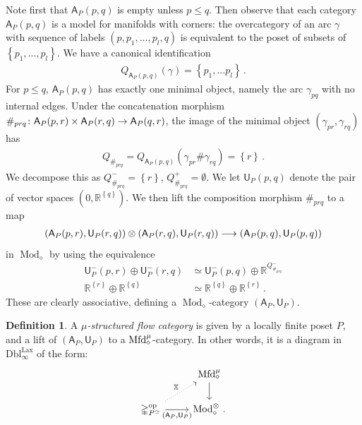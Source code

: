 \documentclass[10pt]{amsart}
\numberwithin{equation}{section}
\theoremstyle{definition}
\newtheorem{definition}[prop]{Definition}
\DeclareMathOperator{\Mod}{Mod}
\DeclareMathOperator{\op}{op}
\DeclareMathOperator{\Lax}{Lax}
\newcommand{\Mfd}{\mathrm{Mfd}\vphantom{d}}
\newcommand{\bR}{\mathbb{R}}
\newcommand{\bX}{\mathbb{X}}
\newcommand{\Simp}{\mathbb{\Delta}}
\newcommand{\sfA}{\mathsf{A}}
\newcommand{\sfU}{\mathsf{U}}
\newcommand{\DblLax}{ \mathrm{Dbl}_{\infty}^{\Lax}  }
\renewcommand{\to}{\mathchoice{\longrightarrow}{\rightarrow}{}{}}
\begin{document}
Note first that $\sfA_{P}(p,q)$ is empty unless $p\leq q$.
Then observe that each category $\sfA_P(p,q)$ is a model for manifolds with corners: the overcategory of an arc $\gamma$ with sequence of labels $(p,p_1,\ldots ,p_{l},q)$ is equivalent to the poset of subsets of $\left\{ p_1,\ldots,p_{l}\right\}$.
We have a canonical identification
\begin{align*}
	Q_{\sfA_{P}(p,q)}(\gamma) = \left\{ p_1,\ldots p_{l} \right\} \,.
\end{align*}
For $p\leq q$, $\sfA_P(p,q)$ has exactly one minimal object, namely the arc $\gamma_{pq}$ with no internal edges.
Under the concatenation morphism $\#_{prq}\colon \sfA_{P}(p,r)\times \sfA_P(r,q) \to \sfA_P(q,r)$, the image of the minimal object $(\gamma_{pr}, \gamma_{rq})$ has
\begin{align*}
	Q_{\#_{prq}} = Q_{\sfA_{P}(p,q)}(\gamma_{pr} \# \gamma_{rq}) = \left\{ r\right\} \,.
\end{align*}
We decompose this as $Q_{\#_{prq}}^{-} = \left\{ r \right\}$, $Q_{\#_{prq}}^{+}=\emptyset$. We let $\sfU_P(p,q)$ denote the pair of vector spaces $(0,\bR^{ \left\{ q\right\} })$. We then lift the composition morphism $\#_{prq}$ to a map
\begin{align*}
	(\sfA_{P}(p,r), \sfU_{P}(r,q)) \otimes (\sfA_{P}(r,q), \sfU_{P}(r,q)) \to (\sfA_{P}(p,q), \sfU_{P}(p,q))
\end{align*}
in $\Mod_{\diamond}$ by using the equivalence
\begin{align}\label{eq:Flow_cat_U_iso}
	\sfU^{-}_P(p,r) \oplus \sfU^{-}_P(r,q)  &\simeq \sfU^{-}_{P}(p,q) \oplus \bR^{Q_{\#_{prq}}^{-}} \\
	\bR^{  \left\{ r\right\}} \oplus \bR^{ \left\{ q\right\}}  &\simeq \bR^{ \left\{ q\right\}} \oplus  \bR^{ \left\{ r \right\}}\,. \nonumber
\end{align}
These are clearly associative, defining a $\Mod_{\diamond}$-category $(\sfA_{P},\sfU_{P})$.

\begin{definition}\label{def:structured_flow_cat}
	A \emph{$\mu$-structured flow category} is given by a locally finite poset $P$, and a lift of $(\sfA_P,\sfU_P)$ to a $\Mfd^{\mu}_{\diamond}$-category.
	In other words, it is a diagram in $\DblLax$ of the form:
	\[
	\begin{tikzcd}
		& \Mfd_{\diamond}^{\mu} \arrow[d] \\
		\Simp_{P^{\simeq}}^{\op} \arrow[r, "(\sfA_{P} {,} \sfU_{P})"'] \arrow[ur, dotted, "\bX"] & \Mod_{\diamond}^{\otimes} \, .
	\end{tikzcd}
	\]
\end{definition}
\end{document}
